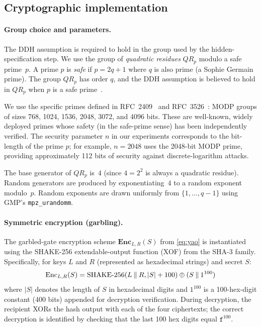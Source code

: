 \subsection{Cryptographic implementation}\label{sec:crypto-impl}

\paragraph{Group choice and parameters.}
The DDH assumption is required to hold in the group used by the hidden-specification step. We use the group of \emph{quadratic residues} $QR_p$ modulo a safe prime~$p$. A prime $p$ is \emph{safe} if $p = 2q + 1$ where $q$ is also prime (a Sophie Germain prime). The group $QR_p$ has order $q$, and the DDH assumption is believed to hold in $QR_p$ when $p$ is a safe prime~\cite{Bon98}.

We use the specific primes defined in RFC~2409~\cite{rfc2409} and RFC~3526~\cite{rfc3526}: MODP groups of sizes 768, 1024, 1536, 2048, 3072, and 4096 bits. These are well-known, widely deployed primes whose safety (in the safe-prime sense) has been independently verified. The security parameter $n$ in our experiments corresponds to the bit-length of the prime $p$; for example, $n = 2048$ uses the 2048-bit MODP prime, providing approximately 112 bits of security against discrete-logarithm attacks.

The base generator of $QR_p$ is~$4$ (since $4 = 2^2$ is always a quadratic residue). Random generators are produced by exponentiating~$4$ to a random exponent modulo~$p$. Random exponents are drawn uniformly from $\{1, \ldots, q-1\}$ using GMP's \texttt{mpz\_urandomm}.

\paragraph{Symmetric encryption (garbling).}
The garbled-gate encryption scheme $\textbf{Enc}_{L,R}(S)$ from \cref{eq:yao} is instantiated using the SHAKE-256 extendable-output function (XOF) from the SHA-3 family. Specifically, for keys $L$ and $R$ (represented as hexadecimal strings) and secret $S$:
\[
\text{Enc}_{L,R}(S) = \text{SHAKE-256}(L \mathbin\| R, |S| + 100) \oplus (S \mathbin\| 1^{100})
\]
where $|S|$ denotes the length of $S$ in hexadecimal digits and $1^{100}$ is a 100-hex-digit constant (400 bits) appended for decryption verification. During decryption, the recipient XORs the hash output with each of the four ciphertexts; the correct decryption is identified by checking that the last 100 hex digits equal $\texttt{f}^{100}$.

